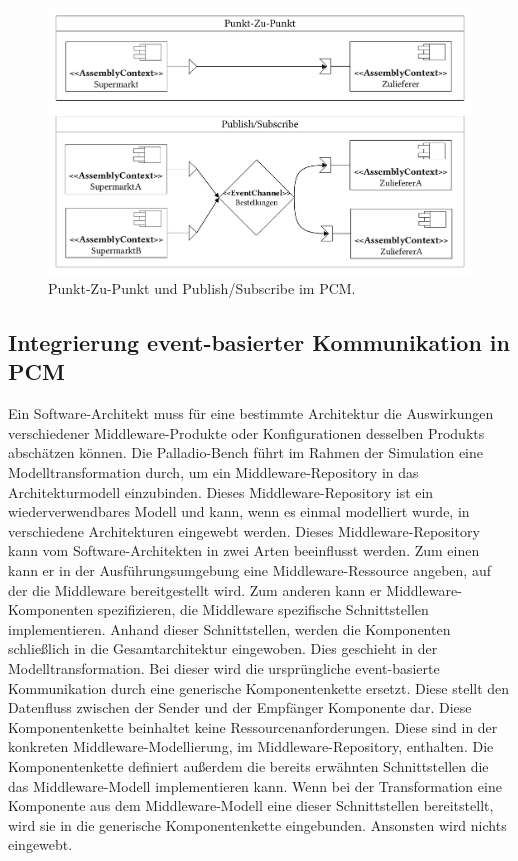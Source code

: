 \begin{figure}
\center
  \includegraphics[width=1\textwidth]{images/grundlagen/grundlagenEventSystem.pdf}
  \caption{Punkt-Zu-Punkt und Publish/Subscribe im PCM.}
  \label{img:grundlageneventssystem}
\end{figure}



\subsection{Integrierung event-basierter Kommunikation in PCM}
\label{sec:eventbasetransformation}
Ein Software-Architekt muss für eine bestimmte Architektur die Auswirkungen verschiedener Middleware-Produkte oder Konfigurationen desselben Produkts abschätzen können. Die Palladio-Bench führt im Rahmen der Simulation eine Modelltransformation durch, um ein Middleware-Repository in das Architekturmodell einzubinden. Dieses Middle\-ware-Repository ist ein wiederverwendbares Modell und kann, wenn es einmal modelliert wurde, in verschiedene Architekturen eingewebt werden. Dieses Middleware-Repository kann vom Software-Architekten in zwei Arten beeinflusst werden. Zum einen kann er in der Ausführungsumgebung eine Middleware-Ressource angeben, auf der die Middleware bereitgestellt wird. Zum anderen kann er Middleware-Komponen\-ten spezifizieren, die Middleware spezifische Schnittstellen implementieren. Anhand dieser Schnittstellen, werden die Komponenten schließlich in die Gesamtarchitektur eingewoben. Dies geschieht in der Modelltransformation. Bei dieser wird die ursprüngliche event-basierte Kommunikation durch eine generische Komponentenkette ersetzt. Diese stellt den Datenfluss zwischen der Sender und der Empfänger Komponente dar. Diese Komponentenkette beinhaltet keine Ressourcenanforderungen. Diese sind in der konkreten Middleware-Modellierung, im Middleware-Repository, enthalten. Die Komponentenkette definiert außerdem die bereits erwähnten Schnittstellen die das Middleware-Modell implementieren kann. Wenn bei der Transformation eine Komponente aus dem Middleware-Modell eine dieser Schnittstellen bereitstellt, wird sie in die generische Komponentenkette eingebunden. Ansonsten wird nichts eingewebt.

